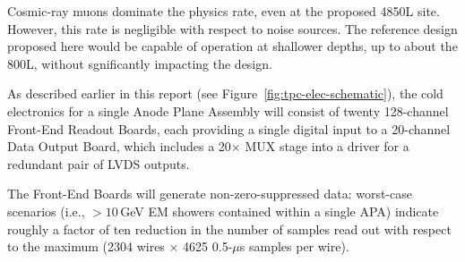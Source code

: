 Cosmic-ray muons dominate the physics rate, even at the proposed 4850L site.  
However, this rate is negligible with respect to noise sources.  The
reference design proposed here would be capable of operation at
shallower depths, up to about the 800L, without sgnificantly impacting
the design.

 As described earlier in this report
(see Figure~\ref{fig:tpc-elec-schematic}), 
the cold electronics for a single Anode Plane Assembly 
will consist of twenty 128-channel Front-End Readout 
Boards, each providing a single digital input to a 20-channel
Data Output Board, which includes a 20$\times$ MUX stage into a  
driver for a redundant pair of LVDS outputs.   

The Front-End Boards will generate non-zero-suppressed data: worst-case 
scenarios (i.e., $>10\,$GeV EM showers contained within a single APA) 
indicate roughly a factor of ten reduction in the number of samples 
read out with respect to the maximum (2304 wires $\times$ 4625 0.5-$\mu$s 
samples per wire).  

